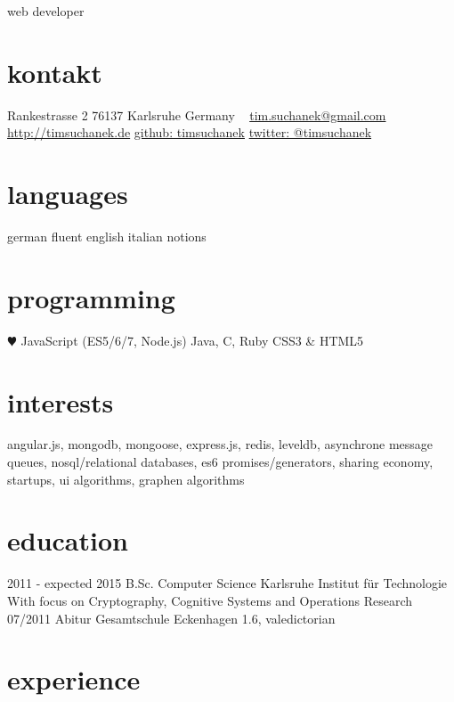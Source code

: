 \documentclass[]{friggeri-cv}
\begin{document}
       {web developer}


\begin{aside}
  \section{kontakt}
    Rankestrasse 2
    76137 Karlsruhe
    Germany
    ~
    \href{mailto:tim.suchanek@gmail.com}{tim.suchanek@gmail.com}
    \href{http://timsuchanek.de}{http://timsuchanek.de}
    \href{https://github.com/timsuchanek/}{github: timsuchanek}
    \href{https://twitter.com/timsuchanek}{twitter: @timsuchanek}
  \section{languages}
    german
    fluent english
    italian notions
  \section{programming}
    {\color{red} $\varheartsuit$} JavaScript
    (ES5/6/7, Node.js)
    Java, C, Ruby
    CSS3 \& HTML5
\end{aside}

\section{interests}

angular.js, mongodb, mongoose, express.js, redis, leveldb, asynchrone message queues, nosql/relational databases, es6 promises/generators, sharing economy, startups, ui algorithms, graphen algorithms

\section{education}

\begin{entrylist}
  \entry
    {2011 - expected 2015}
    {B.Sc. Computer Science}
    {Karlsruhe Institut für Technologie}
    {With focus on Cryptography, Cognitive Systems and Operations Research}
  \entry
    {07/2011}
    {Abitur}
    {Gesamtschule Eckenhagen}
    {1.6, valedictorian}
\end{entrylist}

\section{experience}
\end{document}
